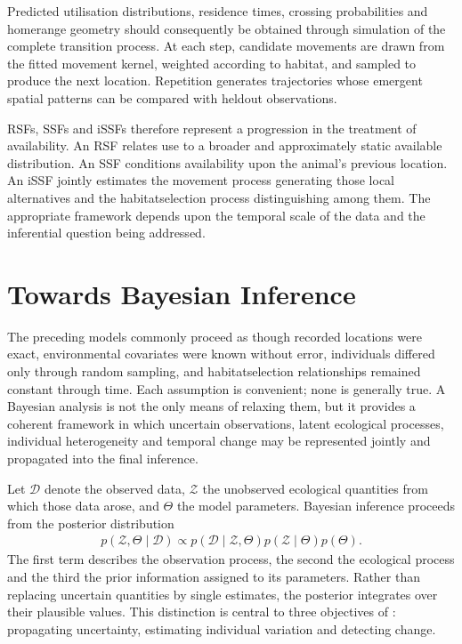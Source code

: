 \documentclass[letterpaper,10pt,english]{sphinxmanual}
\begin{document}
\sphinxAtStartPar
Predicted utilisation distributions, residence times, crossing probabilities and home\sphinxhyphen{}range geometry should consequently be obtained through simulation of the complete transition process. At each step, candidate movements are drawn from the fitted movement kernel, weighted according to habitat, and sampled to produce the next location. Repetition generates trajectories whose emergent spatial patterns can be compared with held\sphinxhyphen{}out observations.

\sphinxAtStartPar
RSFs, SSFs and iSSFs therefore represent a progression in the treatment of availability. An RSF relates use to a broader and approximately static available distribution. An SSF conditions availability upon the animal’s previous location. An iSSF jointly estimates the movement process generating those local alternatives and the habitat\sphinxhyphen{}selection process distinguishing among them. The appropriate framework depends upon the temporal scale of the data and the inferential question being addressed.


\chapter{Towards Bayesian Inference}
\label{\detokenize{theory:towards-bayesian-inference}}
\sphinxAtStartPar
The preceding models commonly proceed as though recorded locations were exact, environmental covariates were known without error, individuals differed only through random sampling, and habitat\sphinxhyphen{}selection relationships remained constant through time. Each assumption is convenient; none is generally true. A Bayesian analysis is not the only means of relaxing them, but it provides a coherent framework in which uncertain observations, latent ecological processes, individual heterogeneity and temporal change may be represented jointly and propagated into the final inference.

\sphinxAtStartPar
Let \(\mathcal{D}\) denote the observed data, \(\mathcal{Z}\) the unobserved ecological quantities from which those data arose, and \(\Theta\) the model parameters. Bayesian inference proceeds from the posterior distribution
\begin{equation*}
\begin{split}
p(\mathcal{Z},\Theta\mid\mathcal{D})
\propto
p(\mathcal{D}\mid\mathcal{Z},\Theta)
p(\mathcal{Z}\mid\Theta)
p(\Theta).
\end{split}
\end{equation*}
\sphinxAtStartPar
The first term describes the observation process, the second the ecological process and the third the prior information assigned to its parameters. Rather than replacing uncertain quantities by single estimates, the posterior integrates over their plausible values. This distinction is central to three objectives of : propagating uncertainty, estimating individual variation and detecting change.
\end{document}
